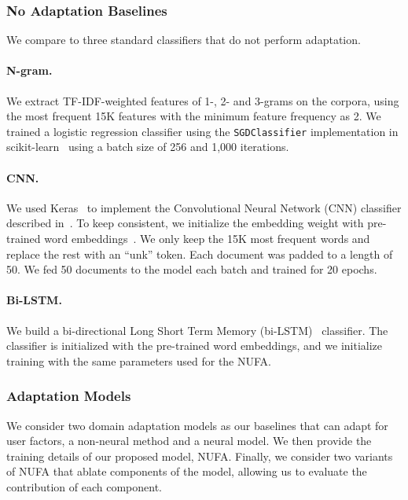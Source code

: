 \subsubsection{No Adaptation Baselines}
We compare to three standard classifiers that do not perform adaptation.

\paragraph{N-gram.} We extract TF-IDF-weighted features of 1-, 2- and 3-grams on the corpora, using the most frequent 15K features with the minimum feature frequency as 2.
We trained a logistic regression classifier using the \texttt{SGDClassifier} implementation in scikit-learn~\cite{pedregosa2011scikit}
using a batch size of 256 and 1,000 iterations. 

\paragraph{CNN.} 
We used Keras~\cite{chollet2015keras} to implement the Convolutional Neural Network (CNN) classifier described in~\cite{kim2014convolutional}. To keep consistent, we initialize the embedding weight with pre-trained word embeddings~\cite{mikolov2013distributed,pennington2014glove}. We only keep the 15K most frequent words and replace the rest with an ``unk'' token. Each document was padded to a length of 50. We fed 50 documents to the model each batch and trained for 20 epochs.

\paragraph{Bi-LSTM.} We build a bi-directional Long Short Term Memory (bi-LSTM)~\cite{hochreiter1997long} classifier. The classifier is initialized with the pre-trained word embeddings, and we initialize training with the same parameters used for the NUFA.


\subsubsection{Adaptation Models}

We consider two domain adaptation models as our baselines that can adapt for user factors, a non-neural method and a neural model.
We then provide the training details of our proposed model, NUFA.
Finally, we consider two variants of NUFA that ablate components of the model, allowing us to evaluate the contribution of each component.

